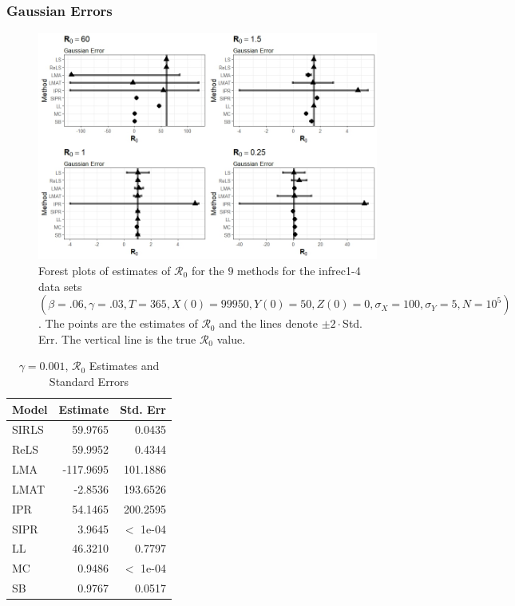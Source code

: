 \documentclass[12pt]{article}
\newcommand{\xxsir}{\ensuremath{9} } %
\newcommand{\rr}{\ensuremath{\mathcal{R}_0}}
\begin{document}
\subsubsection{Gaussian Errors}

\begin{figure}[H]
  \centering
  \includegraphics[scale=0.5]{images/parchange_n.jpeg}
  \caption{Forest plots of estimates of $\rr$ for the \xxsir methods for the infrec1-4 data sets $(\beta=.06, \gamma=.03, T=365, X(0)=99950, Y(0)=50, Z(0)=0, \sigma_X=100, \sigma_Y=5, N=10^5)$.  The points are the estimates of $\rr$ and the lines denote $\pm 2\cdot $Std. Err.  The vertical line is the true $\rr$ value.}
  \label{fig:infrec1-res}
\end{figure}
\begin{table}[H]

	\centering
	\begin{tabular}[t]{l|r|r}
		\hline
		Model & Estimate & Std. Err\\
		\hline
		SIRLS & 59.9765 & 0.0435\\
		\hline
		ReLS & 59.9952 & 0.4344\\
		\hline
		LMA &  -117.9695 & 101.1886 \\
		\hline
		LMAT & -2.8536 & 193.6526 \\
		\hline
		IPR & 54.1465 & 200.2595\\
		\hline
		SIPR & 3.9645 & $<$ 1e-04\\
		\hline
		LL & 46.3210 & 0.7797\\
		\hline
		MC & 0.9486 & $<$ 1e-04 \\
		\hline
		SB & 0.9767 & 0.0517\\
		\hline
	\end{tabular}
        \caption{\label{tab:infrec1-res}$\gamma = 0.001$, $\rr$ Estimates and Standard Errors}
\end{table}
\end{document}
